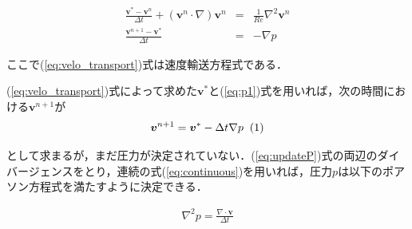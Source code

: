 \documentclass[twocolumn,oneside,a4paper]{article}
\newcommand\inlineeqno{\stepcounter{equation}\ (\theequation)}
\begin{document}
\begin{eqnarray}
	\frac{\bm{v}^{\ast}-\bm{v}^n}{\Delta t} + (\bm{v}^n \cdot \nabla )\bm{v}^n &=& \frac{1}{Re} \nabla^2 \bm{v}^n \label{eq:velo_transport}\\
	\frac{\bm{v}^{n+1}-\bm{v}^{\ast}}{\Delta t} &=& - \nabla p	\label{eq:p1}
\end{eqnarray}

ここで(\ref{eq:velo_transport})式は速度輸送方程式である．

(\ref{eq:velo_transport})式によって求めた$\bm{v}^\ast$と(\ref{eq:p1})式を用いれば，次の時間における$\bm{v}^{n+1}$が
\begin{eqnarray}
\bm{v}^{n+1}=\bm{v}^{\ast}-\Delta t \nabla p \: \inlineeqno \label{eq:updateP}	
\end{eqnarray}

として求まるが，まだ圧力が決定されていない．(\ref{eq:updateP})式の両辺のダイバージェンスをとり，連続の式(\ref{eq:continuous})を用いれば，圧力$p$は以下のポアソン方程式を満たすように決定できる．

\begin{eqnarray}
	\nabla^2 p = \frac{\nabla \cdot \bm{v}}{\Delta t}
\end{eqnarray}












\end{document}

